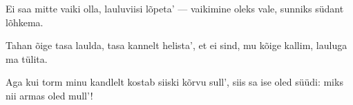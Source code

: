 Ei saa mitte vaiki olla,
lauluviisi l\~opeta' ---
vaikimine oleks vale,
sunniks s\"udant l\~ohkema.

Tahan \~oige tasa laulda,
tasa kannelt helista',
et ei sind, mu k\~oige kallim,
lauluga ma t\"ulita.

Aga kui torm minu kandlelt
kostab siiski k\~orvu sull',
siis sa ise oled s\"u\"udi:
miks nii armas oled mull'!
